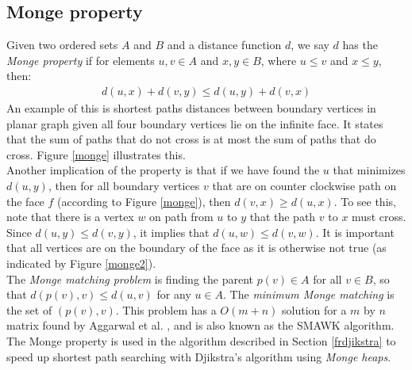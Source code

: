 \subsection{Monge property}
Given two ordered sets $A$ and $B$ and a distance function $d$, we say $d$ has the
\textit{Monge property} if for elements $u, v\in A$ and $x, y\in B$, where
$u\leq v$ and $x\leq y$, then:
\begin{align*}
  d(u,x)+d(v,y)\leq d(u, y)+d(v,x)
\end{align*}
An example of this is shortest paths distances between boundary vertices in planar graph
given all four boundary vertices lie on the infinite face. It states that the sum of
paths that do not cross is at most the sum of paths that do cross. Figure \ref{monge}
illustrates this. \\
Another implication of the property is that if we have found the $u$ that minimizes $d(u,y)$,
then for all boundary vertices $v$ that are on  counter clockwise path on the face $f$
(according to Figure \ref{monge}), then $d(v,x)\geq d(u,x)$. To see this, note that there
is a vertex $w$ on path from $u$ to $y$ that the path $v$ to $x$ must cross. Since
$d(u,y)\leq d(v,y)$, it implies that $d(u,w)\leq d(v,w)$. It is important that all
vertices are on the boundary of the face as it is otherwise not true (as indicated by
Figure \ref{monge2}). \\
The \textit{Monge matching problem} is finding the parent $p(v)\in A$ for all $v\in B$,
so that $d(p(v), v)\leq d(u,v)$ for any $u\in A$. The \textit{minimum Monge matching} is
the set of $(p(v), v)$. This problem has a $O(m+n)$ solution for a $m$ by $n$ matrix found by Aggarwal et al.
\cite{aggarwal1987geometric}, and is also known as the SMAWK algorithm. The Monge property is used in the algorithm described in Section
\ref{frdjikstra} to speed up shortest path searching with Djikstra's algorithm using
\textit{Monge heaps}.

